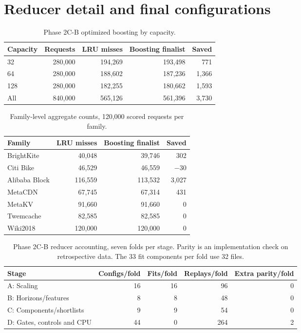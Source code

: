 \documentclass[11pt,letterpaper]{article}
\begin{document}
\clearpage
{}
{}



\appendix
\section{Reducer detail and final configurations}
\begin{table}[ht]
\centering
\begin{tabular}{@{}lrrrr@{}}
\toprule
Capacity & Requests & LRU misses & Boosting finalist & Saved \\ \midrule
32 & 280,000 & 194,269 & 193,498 & 771 \\
64 & 280,000 & 188,602 & 187,236 & 1,366 \\
128 & 280,000 & 182,255 & 180,662 & 1,593 \\
\midrule
All & 840,000 & 565,126 & 561,396 & 3,730 \\
\bottomrule
\end{tabular}
\caption{Phase 2C-B optimized boosting by capacity.}
\end{table}
\begin{table}[ht]
\centering
\begin{tabular}{@{}lrrr@{}}
\toprule
Family & LRU misses & Boosting finalist & Saved \\ \midrule
BrightKite & 40,048 & 39,746 & 302 \\
Citi Bike & 46,529 & 46,559 & $-30$ \\
Alibaba Block & 116,559 & 113,532 & 3,027 \\
MetaCDN & 67,745 & 67,314 & 431 \\
MetaKV & 91,660 & 91,660 & 0 \\
Twemcache & 82,585 & 82,585 & 0 \\
Wiki2018 & 120,000 & 120,000 & 0 \\
\bottomrule
\end{tabular}
\caption{Family-level aggregate counts, 120,000 scored requests per family.}
\end{table}

\begin{table}[ht]
\centering
\begin{tabular}{@{}lrrrr@{}}
\toprule
Stage & Configs/fold & Fits/fold & Replays/fold & Extra parity/fold \\ \midrule
A: Scaling & 16 & 16 & 96 & 0 \\
B: Horizons/features & 8 & 8 & 48 & 0 \\
C: Components/shortlists & 9 & 9 & 54 & 0 \\
D: Gates, controls and CPU & 44 & 0 & 264 & 2 \\
\bottomrule
\end{tabular}
\caption{Phase 2C-B reducer accounting, seven folds per stage. Parity is an implementation check on retrospective data. The 33 fit components per fold use 32 files.}
\end{table}
\end{document}
